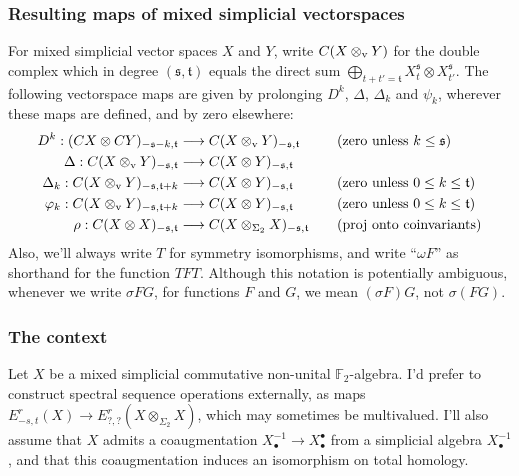 \documentclass[11pt]{amsart}
\theoremstyle{plain}
\theoremstyle{definition}
\let\phi\varphi
\renewcommand{\to}{\longrightarrow}
\newcommand{\frakt}{\mathfrak{t}}
\newcommand{\fraks}{\mathfrak{s}}
\theoremstyle{plain}
\newcommand{\twist}{\omega}
\newcommand{\F}{\mathbb{F}}
\begin{document}
\begin{External spectral sequence operations}
\subsubsection*{Resulting maps of mixed simplicial vectorspaces}
For mixed simplicial vector spaces $X$ and $Y$, write $C(X\otimes_\textup{v}Y)$ for the double complex which in degree $(\fraks,\frakt)$ equals the direct sum $\bigoplus_{t+t'=\frakt}X_t^\fraks\otimes X_{t'}^\fraks$. The following vectorspace maps are given by prolonging $D^k$, $\Delta$, $\Delta_k$ and $\psi_k$, wherever these maps are defined, and by zero elsewhere:
\begin{align*}
{D}^k:(CX\otimes CY)_{-\fraks-k,\frakt}&\to C(X\otimes_\textup{v}Y)_{-\fraks,\frakt}&\quad&\textup{(zero unless $k\leq \fraks$)}\\
{\Delta}:C(X\otimes_\textup{v} Y)_{-\fraks,\frakt}&\to C(X\otimes Y)_{-\fraks,\frakt}\\
{\Delta}_k:C(X\otimes_\textup{v} Y)_{-\fraks,\frakt+k}&\to C(X\otimes Y)_{-\fraks,\frakt}&\quad&\textup{(zero unless $0\leq k\leq \frakt$)}\\
{\phi}_k:C(X\otimes_\textup{v} Y)_{-\fraks,\frakt+k}&\to C(X\otimes Y)_{-\fraks,\frakt}&\quad&\textup{(zero unless $0\leq k\leq \frakt$)}\\
{\rho}:C(X\otimes X)_{-\fraks,\frakt}&\to C(X\otimes_{\Sigma_2} X)_{-\fraks,\frakt}&\quad&\textup{(proj onto coinvariants)}
\end{align*}
Also, we'll always write $T$ for symmetry isomorphisms, and write ``$\twist F$'' as shorthand for the function $TFT$. Although this notation is potentially ambiguous, whenever we write $\sigma FG$, for functions $F$ and $G$, we mean $(\sigma F)G$, not $\sigma(FG)$.

\subsubsection*{The context}
Let $X$ be a mixed simplicial commutative non-unital $\F_2$-algebra. I'd prefer to construct spectral sequence operations externally, as maps $E^r_{-s,t}(X)\to E^r_{?,?}(X\otimes_{\Sigma_2}X)$, which may sometimes be multivalued. I'll also assume that $X$ admits a coaugmentation $X^{-1}_\bullet\to X^\bullet_\bullet$ from a simplicial algebra $X^{-1}_\bullet$, and that this coaugmentation induces an isomorphism on total homology.


\end{External spectral sequence operations}
\end{document}
